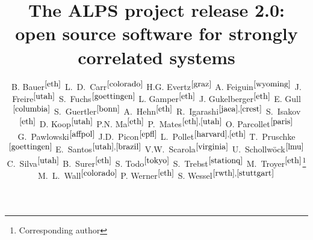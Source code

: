 \documentclass[12pt]{iopart}
\begin{document}
\title{The ALPS project release 2.0: \\ open source software for strongly correlated systems}


\newcommand{\myauthor}[3]{#2$^{#1}$}
\newcommand{\myaddress}[2]{\address{\refstepcounter{affiliation} $^{\arabic{affiliation}}$#2 \label{#1}}}

\author{
	\myauthor{\ref{eth}}{B. Bauer}{bauerb@phys.ethz.ch}
	\myauthor{\ref{colorado}}{L.~D.~Carr}{lcarr@mines.edu}
	\myauthor{\ref{graz}}{H.G. Evertz}{evertz@tugraz.at}
	\myauthor{\ref{wyoming}}{A. Feiguin}{afeiguin@uwyo.edu}
	\myauthor{\ref{utah}}{J. Freire}{juliana@cs.utah.edu}
	\myauthor{\ref{goettingen}}{S.~Fuchs}{fuchs@theorie.physik.uni-goettingen.de}
	\myauthor{\ref{eth}}{L. Gamper}{gamperl@gmail.com}
	\myauthor{\ref{eth}}{J. Gukelberger}{gukelberger@phys.ethz.ch}
	\myauthor{\ref{columbia}}{E. Gull}{gull@phys.columbia.edu}
	\myauthor{\ref{bonn}}{S.~Guertler}{guertler@th.physik.uni-bonn.de}
	\myauthor{\ref{eth}}{A.~Hehn}{hehn@phys.ethz.ch}
	\myauthor{\ref{jaea},\ref{crest}}{R.~Igarashi}{rigarash@hosi.phys.s.u-tokyo.ac.jp}
	\myauthor{\ref{eth}}{S.~Isakov}{isakov@phys.ethz.ch}
	\myauthor{\ref{utah}}{D. Koop}{dakoop@cs.utah.edu}
	\myauthor{\ref{eth}}{P.N. Ma}{pingnang@phys.ethz.ch}
	\myauthor{\ref{eth},\ref{utah}}{P.~Mates}{mates@sci.utah.edu}
	\myauthor{\ref{paris}}{O. Parcollet}{parcolle@spht.saclay.cea.fr}
	\myauthor{\ref{affpol}}{G.~Pawlowski}{gpawlo@amu.edu.pl}
	\myauthor{\ref{epfl}}{J.D.~Picon}{jean-david.picon@epfl.chl}
	\myauthor{\ref{harvard},\ref{eth}}{L.~Pollet}{pollet@phys.ethz.ch}
	\myauthor{\ref{goettingen}}{T.~Pruschke}{pruschke@theorie.physik.uni-goettingen.de}
	\myauthor{\ref{utah},\ref{brazil}}{E.~Santos}{emanuele@sci.utah.edu}
	\myauthor{\ref{virginia}}{V.W.~Scarola}{scarola@vt.edu}
	\myauthor{\ref{lmu}}{U.~Schollw\"ock}{schollwoeck@lmu.de}
	\myauthor{\ref{utah}}{C.~Silva}{csilva@sci.utah.edu}
	\myauthor{\ref{eth}}{B.~Surer}{surerb@phys.ethz.ch}
	\myauthor{\ref{tokyo}}{S. Todo}{wistaria@ap.t.u-tokyo.ac.jp}
	\myauthor{\ref{stationq}}{S.~Trebst}{trebst@kitp.ucsb.edu}
	\myauthor{\ref{eth}}{M.~Troyer}{troyer@ethz.ch}\footnote{Corresponding author}
	\myauthor{\ref{colorado}}{M.~L.~Wall}{mwall@mymail.mines.edu}
	\myauthor{\ref{eth}}{P. Werner}{werner@phys.ethz.ch}
	\myauthor{\ref{rwth},\ref{stuttgart}}{S. Wessel}{wessel@phys.ethz.ch}
}
\end{document}
